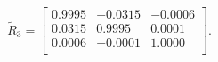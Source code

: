\begin{equation*}
\widetilde{R}_{3} = 
\begin{bmatrix}
  0.9995 &  -0.0315 &  -0.0006 \\
  0.0315 &   0.9995 &   0.0001 \\
  0.0006 &  -0.0001 &   1.0000 \\
\end{bmatrix}.
\end{equation*}
